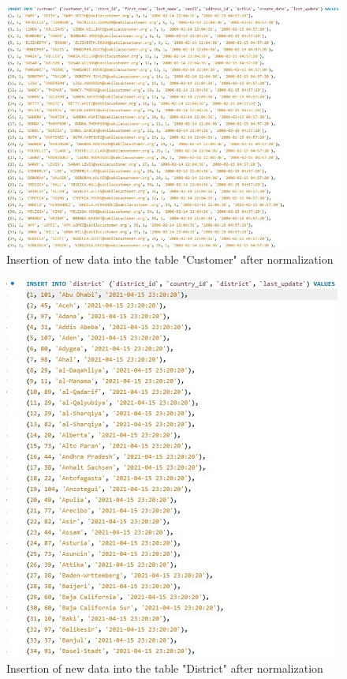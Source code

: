 \documentclass[openany]{article}
\begin{document}
		\begin{figure}[H]
			\includegraphics[width=\textwidth, height=\textheight, keepaspectratio]{customer1_insert_norm}
			\caption{Insertion of new data into the table "Customer" after normalization}
		\end{figure}
		\begin{figure}[H]
			\includegraphics[width=\textwidth, height=\textheight, keepaspectratio]{district1_insert_norm}
			\caption{Insertion of new data into the table "District" after normalization}
		\end{figure}
\end{document}
